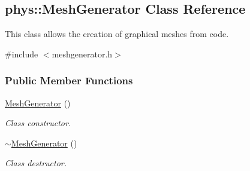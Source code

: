 \hypertarget{classphys_1_1MeshGenerator}{
\subsection{phys::MeshGenerator Class Reference}
\label{classphys_1_1MeshGenerator}
}


This class allows the creation of graphical meshes from code.  




{\ttfamily \#include $<$meshgenerator.h$>$}

\subsubsection*{Public Member Functions}
\begin{DoxyCompactItemize}
\item 
\hypertarget{classphys_1_1MeshGenerator_a70b6d0b67c6e8c833ee2bd85b3265aa7}{
\hyperlink{classphys_1_1MeshGenerator_a70b6d0b67c6e8c833ee2bd85b3265aa7}{MeshGenerator} ()}
\label{classphys_1_1MeshGenerator_a70b6d0b67c6e8c833ee2bd85b3265aa7}

\begin{DoxyCompactList}\small\item\em Class constructor. \item\end{DoxyCompactList}\item 
\hypertarget{classphys_1_1MeshGenerator_a5108974e947a2f0e51d632fd502d0ba0}{
\hyperlink{classphys_1_1MeshGenerator_a5108974e947a2f0e51d632fd502d0ba0}{$\sim$MeshGenerator} ()}
\label{classphys_1_1MeshGenerator_a5108974e947a2f0e51d632fd502d0ba0}

\begin{DoxyCompactList}\small\item\em Class destructor. \item\end{DoxyCompactList}\end{DoxyCompactItemize}
